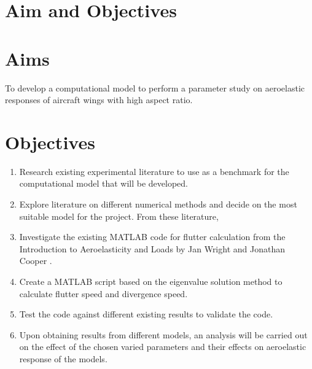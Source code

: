 \documentclass[11pt]{article}
\begin{document}
\section{Aim and Objectives}
\label{sec:aim+obj}
\section*{Aims}
To develop a computational model to perform a parameter study on aeroelastic responses of aircraft wings with high aspect ratio.

\section*{Objectives} 
\begin{enumerate}
    \item Research existing experimental literature to use as a benchmark for the computational model that will be developed. 
    \item Explore literature on different numerical methods and decide on the most suitable model for the project. From these literature, 
    \item Investigate the existing MATLAB code for flutter calculation from the Introduction to Aeroelasticity and Loads by Jan Wright and Jonathan Cooper \cite{Wright2015INTRODUCTIONLOADS}.
   \item Create a MATLAB script based on the eigenvalue solution method to calculate flutter speed and divergence speed.
    \item Test the code against different existing results to validate the code.
    \item Upon obtaining results from different models, an analysis will be carried out on the effect of the chosen varied parameters and their effects on aeroelastic response of the models.
\end{enumerate}
\cleardoublepage
\newpage
\end{document}
